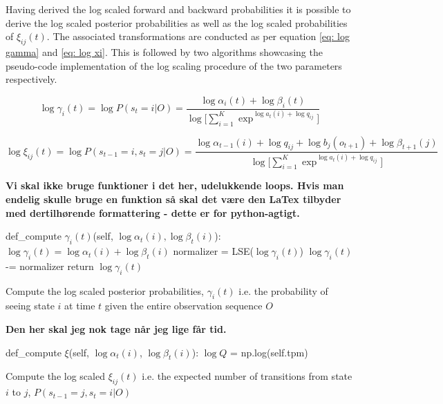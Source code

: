 Having derived the log scaled forward and backward probabilities it is possible to derive the log scaled posterior probabilities as well as the log scaled probabilities of $\xi_{ij}(t)$. The associated transformations are conducted as per equation \ref{eq: log gamma} and \ref{eq: log xi}. This is followed by two algorithms showcasing the pseudo-code implementation of the log scaling procedure of the two parameters respectively.

\begin{equation}
    \log\gamma_i(t) = \log P(s_t=i|O) =
    \frac{\log\alpha_i(t) + \log\beta_i(t)}{\log\Big[\sum_{i=1}^K \exp^{\log a_t(i)+\log q_{ij}}\Big]}  
    \label{eq: log gamma}
\end{equation}

\begin{equation}
    \log\xi_{ij}(t) = \log P(s_{t-1}=i, s_t=j|O) =
    \frac{\log\alpha_{t-1}(i) + \log q_{ij} + \log b_j(o_{t+1}) + \log \beta_{t+1}(j)}{\log\Big[\sum_{i=1}^K \exp^{\log a_t(i)+\log q_{ij}}\Big]}
    \label{eq: log xi}
\end{equation}


\textbf{Vi skal ikke bruge funktioner i det her, udelukkende loops. Hvis man endelig skulle bruge en funktion så skal det være den LaTex tilbyder med dertilhørende formattering - dette er for python-agtigt.}

\begin{algorithm}[H]
def\_compute $\gamma_i(t)$(self, $\log\alpha_t(i), \log\beta_t(i)$): \;
\Indp 
$\log\gamma_i(t) = \log\alpha_t(i) + \log\beta_t(i)$ \;
normalizer = LSE($\log\gamma_i(t)$) \;
$\log\gamma_i(t)$ -= normalizer \;
\BlankLine
return $\log\gamma_i(t)$
\caption{Compute the log scaled posterior probabilities, $\gamma_i(t)$ i.e. the probability of seeing state $i$ at time $t$ given the entire observation sequence $O$}
\label{algo: log_scaled_gamma}
\end{algorithm}


\textbf{Den her skal jeg nok tage når jeg lige får tid.}

\begin{algorithm}[H]
def\_compute $\xi$(self, $\log\alpha_t(i)$, $\log\beta_t(i)$): \;
\Indp 
$\log Q$ = np.log(self.tpm) \;
\BlankLine


\caption{Compute the log scaled $\xi_{ij}(t)$ i.e. the expected number of transitions from state $i$ to $j$, $P(s_{t-1} = j, s_t = i |O)$}
\label{algo: log_scaled_xi}
\end{algorithm}

